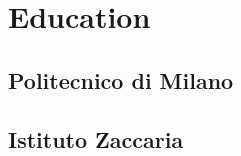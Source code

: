 \documentclass[letterpaper]{deedy-resume} %
\begin{document}
\begin{minipage}[t]{0.33\textwidth} %


\section{Education} 

\subsection{Politecnico di Milano}


\sectionspace %




\subsection{Istituto Zaccaria}


\sectionspace %






\end{minipage}
\end{document}
